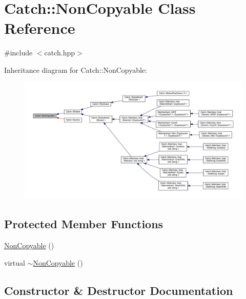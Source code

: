 \hypertarget{class_catch_1_1_non_copyable}{}\section{Catch\+:\+:Non\+Copyable Class Reference}
\label{class_catch_1_1_non_copyable}


{\ttfamily \#include $<$catch.\+hpp$>$}



Inheritance diagram for Catch\+:\+:Non\+Copyable\+:\nopagebreak
\begin{figure}[H]
\begin{center}
\leavevmode
\includegraphics[width=350pt]{class_catch_1_1_non_copyable__inherit__graph}
\end{center}
\end{figure}
\subsection*{Protected Member Functions}
\begin{DoxyCompactItemize}
\item 
\hyperlink{class_catch_1_1_non_copyable_a4b492dd5753f9952350fb64dc6cb9fe2}{Non\+Copyable} ()
\item 
virtual \hyperlink{class_catch_1_1_non_copyable_a81254677280fef337eb4a676e91e3293}{$\sim$\+Non\+Copyable} ()
\end{DoxyCompactItemize}


\subsection{Constructor \& Destructor Documentation}
\hypertarget{class_catch_1_1_non_copyable_a4b492dd5753f9952350fb64dc6cb9fe2}{}\label{class_catch_1_1_non_copyable_a4b492dd5753f9952350fb64dc6cb9fe2} 
